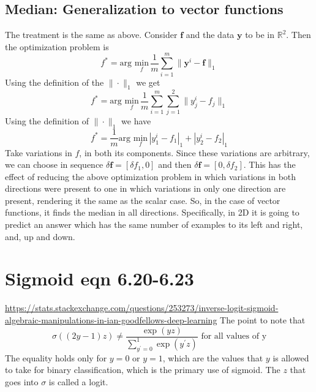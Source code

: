 \documentclass{article}
\newcommand{\beq}{\begin{equation}}
\newcommand{\eeq}{\end{equation}}
\begin{document}
\subsection{Median: Generalization to vector functions}
The treatment is the same as above. Consider $\pmb{f}$ and the data $\pmb{y}$ to be in $\mathbb{R}^2$. Then the optimization problem is
\beq
f^{*} = \text{arg } \underset{f}{\text{min}}\, \frac{1}{m}\sum_{i=1}^{m}\|\pmb{y}^{i}-\pmb{f}\|_1
\eeq
Using the definition of the $\|\cdot\|_1$ we get
\beq
f^{*} = \text{arg } \underset{f}{\text{min}}\, \frac{1}{m}\sum_{i=1}^{m}\sum_{j=1}^{2}\|{y}^{i}_j-f_j\|_1
\eeq
Using the definition of $\|\cdot\|_1$ we have
\beq
f^{*} = \frac{1}{m}\text{arg } \underset{f}{\text{min}}\, |{y}^{i}_1-f_1|_1 + |{y}^{i}_2-f_2|_1
\eeq
Take variations in $f$, in both its components. Since these variations are arbitrary, we can choose in sequence $\delta\pmb{f}=[\delta{f}_1,0]$ and then $\delta\pmb{f}=[0,\delta{f}_2]$. This has the effect of reducing the above optimization problem in which variations in both directions were present to one in which variations in only one direction are present, rendering it the same as the scalar case. So, in the case of vector functions, it finds the median in all directions. Specifically, in 2D it is going to predict an answer which has the same number of examples to its left and right, and, up and down. 
%
%
%
\section{Sigmoid eqn 6.20-6.23}
\url{https://stats.stackexchange.com/questions/253273/inverse-logit-sigmoid-algebraic-manipulations-in-ian-goodfellows-deep-learning}
The point to note that
\beq
\sigma((2y-1)z) \ne \frac{\exp(yz)}{\sum_{y^{'}=0}^{1}\exp(y^{'}z)} \text{ for all values of y}
\eeq
The equality holds only for $y=0$ or $y=1$, which are the values that $y$ is allowed to take for binary classification, which is the primary use of sigmoid. The $z$ that goes into $\sigma$ is called a logit.
\end{document}
